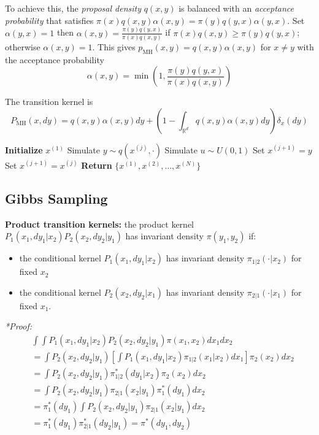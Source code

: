 \documentclass[12pt]{article}
\begin{document}
To achieve this, the \textit{proposal density} $q(x,y)$ is balanced with an \textit{acceptance probability} that satisfies $\pi(x)q(x,y)\alpha(x,y) = \pi(y)q(y,x)\alpha(y,x)$.
Set $\alpha(y,x) = 1$ then $\alpha(x,y) = \frac{\pi(y)q(y,x)}{\pi(x)q(x,y)}$ if $\pi(x)q(x,y) \ge \pi(y)q(y,x)$; otherwise $\alpha(x,y) = 1$. This gives $p_\text{MH}(x,y) = q(x,y) \alpha(x,y)$ for $x \neq y$ with the acceptance probability
$$
\alpha(x,y) = \min \left(1, \frac{\pi(y) q(y,x)}{\pi(x) q(x,y)} \right)
$$

The transition kernel is
$$
P_\text{MH}(x, dy) = q(x,y) \alpha(x,y) dy + \left(1 - \int_{\mathbb{R}^d} q(x,y) \alpha(x,y) dy\right) \delta_x(dy)
$$
\begin{algorithm}
\caption{Metropolis-Hastings Algorithm}
\begin{algorithmic}
\State \textbf{Initialize} $x^{(1)}$
    \State Simulate $y \sim q(x^{(j)}, \cdot)$ 
    \State Simulate $u \sim U(0, 1)$ 
     
        \State Set $x^{(j+1)} = y$ 
    \Else
        \State Set $x^{(j+1)} = x^{(j)}$ 
    \EndIf
\EndFor
\State \textbf{Return} $\{x^{(1)}, x^{(2)}, \dots, x^{(N)}\}$
\end{algorithmic}
\end{algorithm}

\subsection{Gibbs Sampling}
\textbf{Product transition kernels:} the product kernel $P_1(x_1, dy_1| x_2)P_2(x_2, dy_2 | y_1)$ has invariant density $\pi(y_1, y_2)$ if:
\begin{itemize}
\item the conditional kernel $P_1(x_1, dy_1 | x_2)$ has invariant density $\pi_{1|2}(\cdot | x_2)$ for fixed $x_2$
\item the conditional kernel $P_2(x_2, dy_2 | x_1)$ has invariant density $\pi_{2|1}(\cdot | x_1)$ for fixed $x_1$.
\end{itemize}

\textit{*Proof:}
\begin{align*}
&\int \int P_1(x_1, dy_1 | x_2) P_2(x_2, dy_2 | y_1) \pi(x_1, x_2) dx_1 dx_2 \\
&= \int P_2(x_2, dy_2 | y_1) \left[ \int P_1(x_1, dy_1 | x_2) \pi_{1|2}(x_1 | x_2) dx_1 \right] \pi_{2}(x_2) dx_2 \\
&= \int P_2(x_2, dy_2 | y_1) \pi^*_{1|2}(dy_1 | x_2) \pi_{2}(x_2) dx_2 \\
&= \int P_2(x_2, dy_2 | y_1) \pi_{2|1}(x_2 | y_1) \pi^*_1(dy_1) dx_2 \\
&= \pi^*_1(dy_1) \int P_2(x_2, dy_2 | y_1) \pi_{2|1}(x_2 | y_1) dx_2 \\
&= \pi^*_1(dy_1) \pi^*_{2|1}(dy_2 | y_1) = \pi^*(dy_1, dy_2)
\end{align*}
\end{document}
